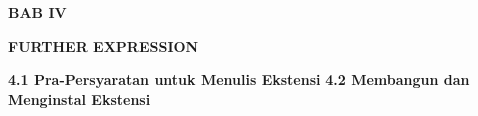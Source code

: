 \documentclass[a4paper,12pt]{report}
\begin{document}
\sloppy
\begin{center}{\fontsize{14pt}{14pt}\selectfont \textbf{BAB IV} \\}\end{center} \par
\noindent 
\begin{center}{\fontsize{14pt}{14pt}\selectfont \textbf{FURTHER EXPRESSION} \\}\end{center} 
\textbf{4.1 Pra-Persyaratan untuk Menulis Ekstensi}
\textbf{4.2 Membangun dan Menginstal Ekstensi} 
\end{document}

